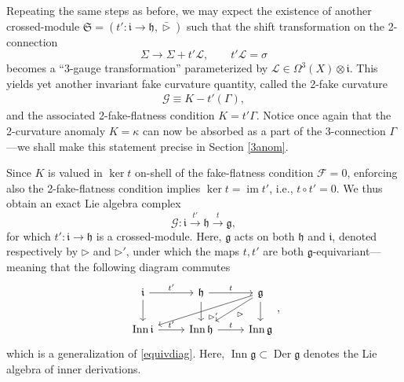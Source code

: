 \documentclass[onecolumn]{article}
\theoremstyle{theorem}
\theoremstyle{remark}
\theoremstyle{example}
\theoremstyle{definition}
\numberwithin{equation}{section}
\def\g{\mathfrak g}
\def\h{\mathfrak h}
\begin{document}
Repeating the same steps as before, we may expect the existence of another crossed-module $\mathfrak{S}=(t':\mathfrak{i}\rightarrow \mathfrak{h},\bar\rhd)$ such that the shift transformation on the 2-connection
\begin{equation}
    \Sigma\rightarrow \Sigma+ t'\mathcal{L},\qquad t'\mathcal{L} = \sigma\nonumber
\end{equation}
becomes a ``3-gauge transformation'' parameterized by $\mathcal{L}\in\Omega^3(X)\otimes\mathfrak{i}$. This yields yet another invariant fake curvature quantity, called the {2-fake curvature}
\begin{eqnarray}
    \mathcal{G}\equiv K-t'(\Gamma),\nonumber
\end{eqnarray}
and the associated 2-fake-flatness condition $K=t'\Gamma$. Notice once again that the 2-curvature anomaly $K=\kappa$ can now be absorbed as a part of the 3-connection $\Gamma$---we shall make this statement precise in Section \ref{3anom}.



Since $K$ is valued in $\operatorname{ker}t$ on-shell of the fake-flatness condition $\mathcal{F}=0$, enforcing also the 2-fake-flatness condition implies $\operatorname{ker}t = \operatorname{im} t'$, i.e., $t\circ t'=0$. We thus obtain an exact Lie algebra complex
\begin{equation}
    \mathscr{G}: \mathfrak{i}\xrightarrow{t'}\mathfrak{h}\xrightarrow{t}\mathfrak{g},\label{eq:3comp}
\end{equation}
for which $t':\mathfrak{i}\rightarrow \h$ is a crossed-module. Here, $\mathfrak{g}$ acts on both $\mathfrak{h}$ and $\mathfrak{i}$, denoted respectively by $\rhd$ and $\rhd'$, under which the maps $t,t'$ are both $\mathfrak{g}$-equivariant---meaning that the following diagram commutes
\begin{equation}
\begin{tikzcd}
\mathfrak{i} \arrow[r, "t'"] \arrow[d]                                     & \mathfrak{h} \arrow[r, "t"]  \arrow[d]                                   & \mathfrak{g} \arrow[d] \arrow[ld, "\rhd"] \arrow[lld, "\rhd'",description] \\
\operatorname{Inn}\mathfrak{i} \arrow[r, "t'"] & \operatorname{Inn}\mathfrak{h} \arrow[r, "t"]  & \operatorname{Inn}\mathfrak{g}  
\end{tikzcd},\nonumber
\end{equation} 
which is a generalization of \eqref{equivdiag}. Here, $\operatorname{Inn}\g\subset\operatorname{Der}\g$ denotes the Lie algebra of inner derivations. 
\end{document}

